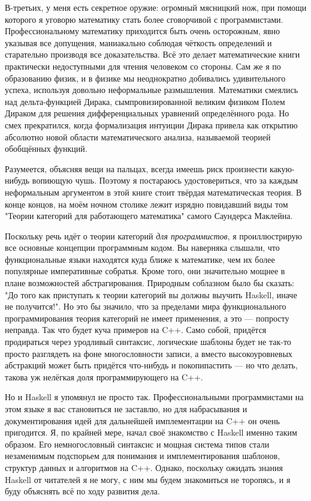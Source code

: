 В-третьих, у меня есть секретное оружие: огромный мясницкий нож, при помощи которого
я уговорю математику стать более сговорчивой с программистами. Профессиональному
математику приходится быть очень осторожным, явно указывая все допущения,
маниакально соблюдая чёткость определений и старательно производя все доказательства.
Всё это делает математические книги практически недоступными для чтения человеком со стороны.
Сам же я по образованию физик, и в физике мы неоднократно добивались удивительного успеха,
используя довольно неформальные размышления. Математики смеялись над дельта-функцией Дирака,
сымпровизированной великим физиком Полем Дираком для решения дифференциальных уравнений
определённого рода. Но смех прекратился, когда формализация интуиции Дирака привела как
открытию абсолютно новой области математического анализа, называемой теорией обобщённых функций.

Разумеется, объясняя вещи на пальцах, всегда имеешь риск произнести какую-нибудь вопиющую чушь.
Поэтому я постараюсь удостовериться, что за каждым неформальным аргументом в этой книге стоит
твёрдая математическая теория. В конце концов, на моём ночном столике лежит изрядно повидавший виды
том "Теории категорий для работающего математика" самого Саундерса Маклейна.

Поскольку речь идёт о теории категорий \emph{для программистов}, я проиллюстрирую
все основные концепции программным кодом. Вы наверняка слышали, что функциональные языки
находятся куда ближе к математике, чем их более популярные императивные собратья.
Кроме того, они значительно мощнее в плане возможностей абстрагирования. Природным соблазном
было бы сказать: "До того как приступать к теории категорий вы должны выучить Haskell, иначе не получится!".
Но это бы значило, что за пределами мира функционального программирования теория категорий не имеет применения,
а это — попросту неправда. Так что будет куча примеров на C++. Само собой, придётся продираться через
уродливый синтаксис, логические шаблоны будет не так-то просто разглядеть на фоне многословности записи,
а вместо высокоуровневых абстракций может быть придётся что-нибудь и покопипастить — но что делать, такова уж
нелёгкая доля программирующего на C++.

Но и Haskell я упомянул не просто так. Профессиональными программистами на этом языке я вас становиться не заставлю,
но для набрасывания и документирования идей для дальнейшей имплементации на C++ он очень пригодится. Я, по крайней мере,
начал своё знакомство с Haskell именно таким образом. Его немногословный синтаксис и мощная система типов стали незаменимым
подспорьем для понимания и имплементирования шаблонов, структур данных и алгоритмов на C++. Однако, поскольку ожидать знания
Haskell от читателей я не могу, с ним мы будем знакомиться не торопясь, и я буду объяснять всё по ходу развития дела.

